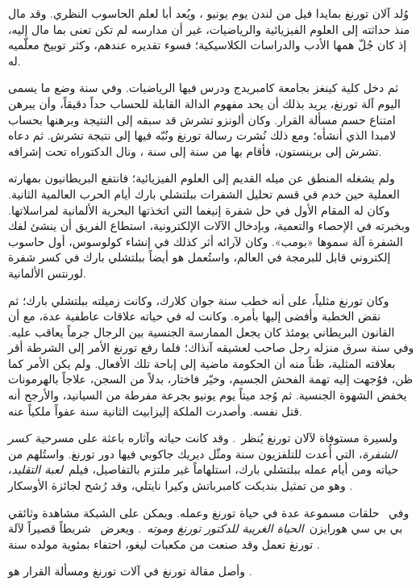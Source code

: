 \documentclass[../../../include/open-logic-section]{subfiles}
\begin{document}


وُلد آلان تورنغ بمايدا فيل من لندن يوم  يونيو ، ويُعد أبا لعلم
الحاسوب النظري. وقد مال منذ حداثته إلى العلوم الفيزيائية والرياضيات، غير
أن مدارسه لم تكن تعنى بما مال إليه، إذ كان جُلّ همها الأدب والدراسات
الكلاسيكية؛ فسوء تقديره عندهم، وكثر توبيخ معلّميه له.


ثم دخل كلية كينغز بجامعة كامبريدج ودرس فيها الرياضيات. وفي سنة  وضع
ما يسمى اليوم آلة تورنغ، يريد بذلك أن يحد مفهوم الدالة القابلة للحساب حداً
دقيقاً، وأن يبرهن امتناع حسم مسألة القرار. وكان ألونزو تشرش قد سبقه إلى
النتيجة وبرهنها بحساب لامبدا الذي أنشأه؛ ومع ذلك نُشرت رسالة تورنغ ونُبّه
فيها إلى نتيجة تشرش. ثم دعاه تشرش إلى برينستون، فأقام بها من سنة  إلى
سنة ، ونال الدكتوراه تحت إشرافه.

ولم يشغله المنطق عن ميله القديم إلى العلوم الفيزيائية؛ فانتفع البريطانيون
بمهارته العملية حين خدم في قسم تحليل الشفرات ببلتشلي بارك أيام الحرب
العالمية الثانية. وكان له المقام الأول في حل شفرة إنيغما التي اتخذتها
البحرية الألمانية لمراسلاتها. وبخبرته في الإحصاء والتعمية، وبإدخال الآلات
الإلكترونية، استطاع الفريق أن ينشئ لفك الشفرة آلة سموها «بومب». وكان
لآرائه أثر كذلك في إنشاء كولوسوس، أول حاسوب إلكتروني قابل للبرمجة في
العالم، واستُعمل هو أيضاً ببلتشلي بارك في كسر شفرة لورنتس الألمانية.

وكان تورنغ مثلياً، على أنه خطب سنة  جوان كلارك، وكانت زميلته ببلتشلي
بارك؛ ثم نقض الخطبة وأفضى إليها بأمره. وكانت له في حياته علاقات عاطفية
عدة، مع أن القانون البريطاني يومئذ كان يجعل الممارسة الجنسية بين الرجال
جرماً يعاقب عليه. وفي سنة  سرق منزله رجل صاحب لعشيقه آنذاك؛ فلما رفع
تورنغ الأمر إلى الشرطة أقر بعلاقته المثلية، ظناً منه أن الحكومة ماضية إلى
إباحة تلك الأفعال. ولم يكن الأمر كما ظن، فوُجهت إليه تهمة الفحش الجسيم،
وخيّر فاختار، بدلاً من السجن، علاجاً بالهرمونات يخفض الشهوة الجنسية. ثم
وُجد ميتاً يوم  يونيو  بجرعة مفرطة من السيانيد، والأرجح أنه قتل نفسه.
وأصدرت الملكة إليزابيث الثانية سنة  عفواً ملكياً عنه.

\begin{reading}
ولسيرة مستوفاة لآلان تورنغ يُنظر~\citet{Hodges2014}. وقد كانت حياته وآثاره
باعثة على مسرحية~\emph{كسر الشفرة}، التي أُعدت للتلفزيون سنة  ومثّل
ديريك جاكوبي فيها دور تورنغ. واستُلهم من حياته ومن أيام عمله ببلتشلي بارك،
استلهاماً غير ملتزم بالتفاصيل، فيلم~\emph{لعبة التقليد}، وهو من تمثيل
بنديكت كامبرباتش وكيرا نايتلي، وقد رُشح لجائزة الأوسكار
\citep{Imitation2014}.

وفي~\citet{Radiolab2012} حلقات مسموعة عدة في حياة تورنغ وعمله. ويمكن على
الشبكة مشاهدة وثائقي بي بي سي هورايزن~\emph{الحياة الغريبة للدكتور
  تورنغ وموته}~\citep{Sykes1992}. ويعرض~\citep{Theelen2012} شريطاً قصيراً
لآلة تورنغ تعمل وقد صنعت من مكعبات ليغو، احتفاء بمئوية مولده سنة .

وأصل مقالة تورنغ في آلات تورنغ ومسألة القرار هو \citet{Turing1937}.
\end{reading}
\end{document}
